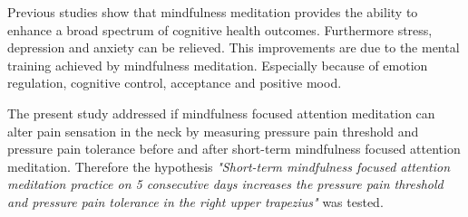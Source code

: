 Previous studies show that mindfulness meditation provides the ability to enhance a broad spectrum of cognitive health outcomes. Furthermore stress, depression and anxiety can be relieved. This improvements are due to the mental training achieved by mindfulness meditation. Especially because of emotion regulation, cognitive control, acceptance and positive mood. \cite{Zeidan2012,Zeidan2016} 


The present study addressed if mindfulness focused attention meditation can alter pain sensation in the neck by measuring pressure pain threshold and pressure pain tolerance before and after short-term mindfulness focused attention meditation. Therefore the hypothesis  \textit{"Short-term mindfulness focused attention meditation practice on 5 consecutive days increases the pressure pain threshold and pressure pain tolerance in the right upper trapezius"} was tested.

